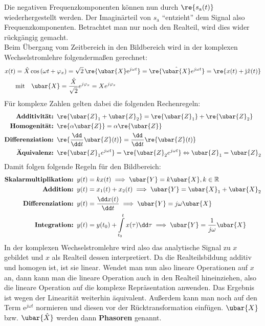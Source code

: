   Die negativen Frequenzkomponenten können nun durch $\re{s_\mathrm{a}(t)}$ wiederhergestellt werden. Der Imaginärteil von $s_\mathrm{a}$ \enquote{entzieht} dem Signal also Frequenzkomponenten. Betrachtet man nur noch den Realteil, wird dies wider rückgängig gemacht.\\
  Beim Übergang vom Zeitbereich in den Bildbereich wird in der komplexen Wechselstromlehre folgendermaßen gerechnet:
  	\begin{equation}\begin{split}
  		x(t) &= \hat{X} \cos\left(\omega t + \varphi_x\right) = \sqrt{2}\,\re{\ubar{X} \mathrm{e}^{j \omega t}} = \re{\hat{\ubar{X}} e^{j \omega t}}=\re{x(t)+ \mathrm{j}\hat{x}(t)} \\
  		&\text{mit\ \ \ } \ubar{X} = \frac{\hat{X}}{\sqrt{2}} e^{j\varphi_x} = X e^{j\varphi_x}
  \end{split}\end{equation}
	Für komplexe Zahlen gelten dabei die folgenden Rechenregeln:
  \begin{equation}\begin{split}
  		\textbf{Additivität: }& \re{\ubar{Z}_1+\ubar{Z}_2}=\re{\ubar{Z}_1}+\re{\ubar{Z}_2} \\
  		\textbf{Homogenität: }& \re{\alpha\ubar{Z}}=\alpha \re{\ubar{Z}}\\
  		\textbf{Differenziation: }&\re{\frac{\dd}{\dd t}\ubar{Z}(t)}= \frac{\dd}{\dd t}\re{\ubar{Z}(t)}\\
  		\textbf{Äquivalenz: }& \re{\ubar{Z}_1e^{j\omega t}} =\re{\ubar{Z}_2e^{j\omega t}} \Leftrightarrow \ubar{Z}_1 = \ubar{Z}_2
  \end{split}\end{equation}
  Damit folgen folgende Regeln für den Bildbereich:
  \begin{equation}\begin{split}
  		\textbf{Skalarmultiplikation: }& y(t)=kx(t) \implies \ubar{Y}=k\ubar{X}, k\in\mathbb{R} \\
  		\textbf{Addition: }& y(t)=x_1(t)+x_2(t) \implies \ubar{Y}=\ubar{X}_1+\ubar{X}_2\\
  		\textbf{Differenziation: }&y(t)=\frac{\dd x(t)}{\dd t} \implies \ubar{Y}=j\omega\ubar{X}\\
  		\textbf{Integration: }& y(t)=y(t_0)+\int\limits_{t_0}^t x(\tau ) \dd \tau \implies \ubar{Y}=\frac{1}{j\omega}\ubar{X}
  \end{split}\end{equation}
	In der komplexen Wechselstromlehre wird also das analytische Signal zu $x$ gebildet und $x$ als Realteil dessen interpretiert. Da die Realteilsbildung additiv und homogen ist, ist sie linear. Wendet man nun also lineare Operationen auf $x$ an, dann kann man die lineare Operation auch in den Realteil hineinziehen, also die lineare Operation auf die komplexe Repräsentation anwenden. Das Ergebnis ist wegen der Linearität weiterhin äquivalent. Außerdem kann man noch auf den Term $\mathrm{e}^{j \omega t}$ normieren und diesen vor der Rücktransformation einfügen. $\ubar{X}$ bzw. $\ubar{\hat{X}}$ werden dann \textbf{Phasoren} genannt.\\
